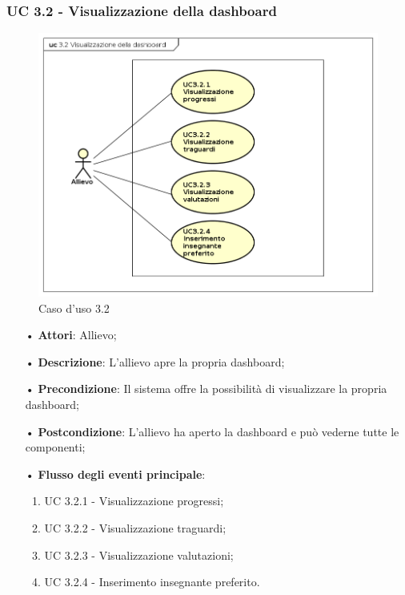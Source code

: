 \subsubsection{UC 3.2 - Visualizzazione della dashboard}
\begin{figure}[H]
\centering
\includegraphics[width=17cm]{img/UC32.png} 
\caption{Caso d'uso 3.2}\label{fig:32}
\end{figure}
\begin{itemize}
\item[•]\textbf{Attori}: Allievo;
\item[•]\textbf{Descrizione}: L’allievo apre la propria dashboard;
\item[•]\textbf{Precondizione}: Il sistema offre la possibilità di visualizzare la propria dashboard;
\item[•]\textbf{Postcondizione}: L’allievo ha aperto la dashboard e può vederne tutte le componenti;
\item[•]\textbf{Flusso degli eventi principale}:
\begin{enumerate}
\item UC 3.2.1 - Visualizzazione progressi;
\item UC 3.2.2 - Visualizzazione traguardi;
\item UC 3.2.3 - Visualizzazione valutazioni;
\item UC 3.2.4 - Inserimento insegnante preferito.
\end{enumerate}
\end{itemize}

